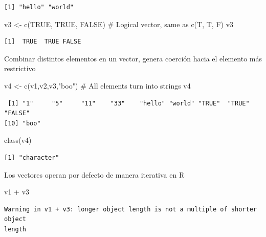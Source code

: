 \documentclass[
  letterpaper,
  DIV=11,
  numbers=noendperiod]{scrartcl}
\newenvironment{Shaded}{\begin{snugshade}}{\end{snugshade}}
\newcommand{\CommentTok}[1]{\textcolor[rgb]{0.37,0.37,0.37}{#1}}
\newcommand{\ConstantTok}[1]{\textcolor[rgb]{0.56,0.35,0.01}{#1}}
\newcommand{\FunctionTok}[1]{\textcolor[rgb]{0.28,0.35,0.67}{#1}}
\newcommand{\NormalTok}[1]{\textcolor[rgb]{0.00,0.23,0.31}{#1}}
\newcommand{\OtherTok}[1]{\textcolor[rgb]{0.00,0.23,0.31}{#1}}
\newcommand{\SpecialCharTok}[1]{\textcolor[rgb]{0.37,0.37,0.37}{#1}}
\newcommand{\StringTok}[1]{\textcolor[rgb]{0.13,0.47,0.30}{#1}}
\begin{document}
\begin{verbatim}
[1] "hello" "world"
\end{verbatim}

\begin{Shaded}
\begin{Highlighting}[]
\NormalTok{v3 }\OtherTok{\textless{}{-}} \FunctionTok{c}\NormalTok{(}\ConstantTok{TRUE}\NormalTok{, }\ConstantTok{TRUE}\NormalTok{, }\ConstantTok{FALSE}\NormalTok{)  }\CommentTok{\# Logical vector, same as c(T, T, F)}
\NormalTok{v3}
\end{Highlighting}
\end{Shaded}

\begin{verbatim}
[1]  TRUE  TRUE FALSE
\end{verbatim}

Combinar distintos elementos en un vector, genera coerción hacia el
elemento más restrictivo

\begin{Shaded}
\begin{Highlighting}[]
\NormalTok{v4 }\OtherTok{\textless{}{-}} \FunctionTok{c}\NormalTok{(v1,v2,v3,}\StringTok{"boo"}\NormalTok{)     }\CommentTok{\# All elements turn into strings}
\NormalTok{v4}
\end{Highlighting}
\end{Shaded}

\begin{verbatim}
 [1] "1"     "5"     "11"    "33"    "hello" "world" "TRUE"  "TRUE"  "FALSE"
[10] "boo"  
\end{verbatim}

\begin{Shaded}
\begin{Highlighting}[]
\FunctionTok{class}\NormalTok{(v4)}
\end{Highlighting}
\end{Shaded}

\begin{verbatim}
[1] "character"
\end{verbatim}

Los vectores operan por defecto de manera iterativa en R

\begin{Shaded}
\begin{Highlighting}[]
\NormalTok{v1 }\SpecialCharTok{+}\NormalTok{ v3     }
\end{Highlighting}
\end{Shaded}

\begin{verbatim}
Warning in v1 + v3: longer object length is not a multiple of shorter object
length
\end{verbatim}
\end{document}
